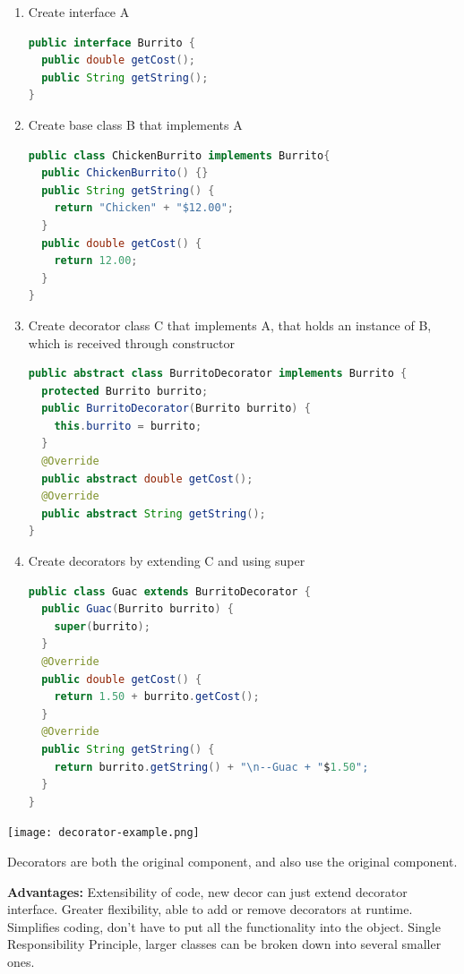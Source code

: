 \documentclass[letterpaper, 8pt]{extarticle}
\begin{document}
\begin{multicols*}{5}
  \begin{enumerate}
    \item Create interface A
          \begin{lstlisting}[language=Java, breaklines=true]
public interface Burrito {
  public double getCost();
  public String getString();
}
        \end{lstlisting}
    \item Create base class B that implements A
          \begin{lstlisting}[language=Java, breaklines=true]
public class ChickenBurrito implements Burrito{
  public ChickenBurrito() {}
  public String getString() {
    return "Chicken" + "$12.00";
  }
  public double getCost() {
    return 12.00;
  }
}
        \end{lstlisting}
    \item Create decorator class C that implements A,
          that holds an instance of B,
          which is received through constructor
          \begin{lstlisting}[language=Java, breaklines=true]
public abstract class BurritoDecorator implements Burrito {
  protected Burrito burrito;
  public BurritoDecorator(Burrito burrito) {
    this.burrito = burrito;
  }
  @Override
  public abstract double getCost();
  @Override
  public abstract String getString();
}
        \end{lstlisting}
    \item Create decorators by extending C and using super
          \begin{lstlisting}[language=Java, breaklines=true]
public class Guac extends BurritoDecorator {
  public Guac(Burrito burrito) {
    super(burrito);
  }
  @Override
  public double getCost() {
    return 1.50 + burrito.getCost();
  }
  @Override
  public String getString() {
    return burrito.getString() + "\n--Guac + "$1.50";
  }
}\end{lstlisting}
  \end{enumerate}

  \begin{center}
    \texttt{[image: decorator-example.png]}
  \end{center}

  Decorators are both the original component, and also use the original component.

  \textbf{Advantages:}
  Extensibility of code, new decor can just extend decorator interface.
  Greater flexibility, able to add or remove decorators at runtime.
  Simplifies coding, don't have to put all the functionality into the object.
  Single Responsibility Principle, larger classes can be broken down into several smaller ones.


\end{multicols*}
\end{document}
